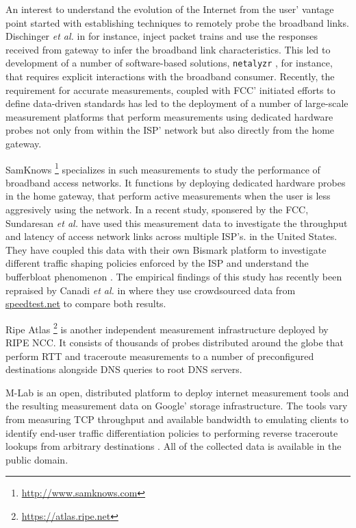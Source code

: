 An interest to understand the evolution of the Internet from the user' vantage
point started with establishing techniques to remotely probe the broadband
links. Dischinger \emph{et al.} in \cite{dischinger:2007} for instance, inject
packet trains and use the responses received from gateway to infer the
broadband link characteristics. This led to development of a number of
software-based solutions, \texttt{netalyzr} \cite{kreibich:2010}, for
instance, that requires explicit interactions with the broadband consumer.
Recently, the requirement for accurate measurements, coupled with \ac{FCC}'
initiated efforts to define data-driven standards has led to the deployment of
a number of large-scale measurement platforms that perform measurements using
dedicated hardware probes not only from within the ISP' network but also
directly from the home gateway.

SamKnows \footnote{\url{http://www.samknows.com}} specializes in such
measurements to study the performance of broadband access networks. It
functions by deploying dedicated hardware probes in the home gateway, that
perform active measurements when the user is less aggresively using the
network. In a recent study, sponsered by the \ac{FCC}, Sundaresan \emph{et
al.} \cite{sundaresan:2011} have used this measurement data to investigate the
throughput and latency of access network links across multiple ISP's. in the
United States. They have coupled this data with their own Bismark platform
\cite{sundaresan:2012} to investigate different traffic shaping policies
enforced by the ISP and understand the bufferbloat phenomenon
\cite{gettys:2012}. The empirical findings of this study has recently been
repraised by Canadi \emph{et al.} in \cite{canadi:2012} where they use
crowdsourced data from \url{speedtest.net} to compare both results.

Ripe Atlas \footnote{\url{https://atlas.ripe.net}} is another independent
measurement infrastructure deployed by \ac{RIPE NCC}. It consists of thousands
of probes distributed around the globe that perform \ac{RTT} and traceroute
measurements to a number of preconfigured destinations alongside DNS queries
to root DNS servers.

\ac{M-Lab} \cite{dovrolis:2010} is an open, distributed platform to deploy
internet measurement tools and the resulting measurement data on Google'
storage infrastructure. The tools vary from measuring TCP throughput and
available bandwidth to emulating clients to identify end-user traffic
differentiation policies \cite{dischinger:2010, kanuparthy:2011} to performing
reverse traceroute lookups from arbitrary destinations \cite{bassett:2010}.
All of the collected data is available in the public domain.

